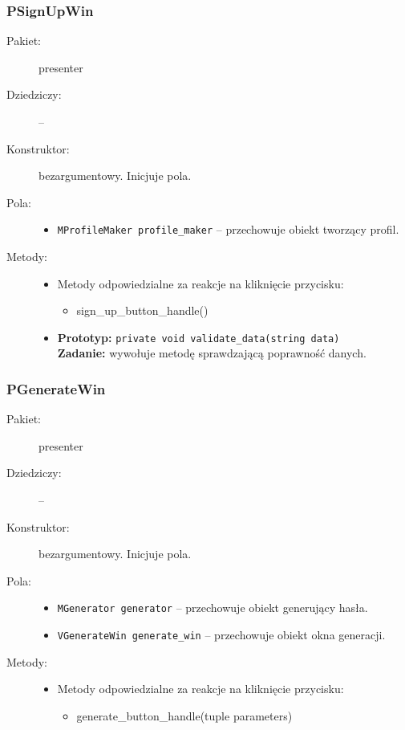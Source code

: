 \documentclass[a4paper]{article}
\newcommand{\prog}{\texttt}
\begin{document}
\subsubsection{PSignUpWin}
\begin{description}
    \item[Pakiet:] presenter
    \item[Dziedziczy:] --
    \item[Konstruktor:] bezargumentowy. Inicjuje pola.
    \item[Pola:] \hfill
    \begin{itemize}
        \item \prog{MProfileMaker profile\_maker} -- przechowuje obiekt tworzący profil.
    \end{itemize}
    \item[Metody:] \hfill
    \begin{itemize}
        \item Metody odpowiedzialne za reakcje na kliknięcie przycisku:
        \begin{itemize}
            \item sign\_up\_button\_handle()
        \end{itemize}
        \item \textbf{Prototyp:} \prog{private void validate\_data(string data)}\\\textbf{Zadanie:} wywołuje metodę sprawdzającą poprawność danych.
    \end{itemize}
\end{description}

\subsubsection{PGenerateWin}
\begin{description}
    \item[Pakiet:] presenter
    \item[Dziedziczy:] --
    \item[Konstruktor:] bezargumentowy. Inicjuje pola.
    \item[Pola:] \hfill
    \begin{itemize}
        \item \prog{MGenerator generator} -- przechowuje obiekt generujący hasła.
        \item \prog{VGenerateWin generate\_win} -- przechowuje obiekt okna generacji.
    \end{itemize}
    \item[Metody:] \hfill
    \begin{itemize}
        \item Metody odpowiedzialne za reakcje na kliknięcie przycisku:
        \begin{itemize}
            \item generate\_button\_handle(tuple parameters)
        \end{itemize}
    \end{itemize}
\end{description}
\end{document}

